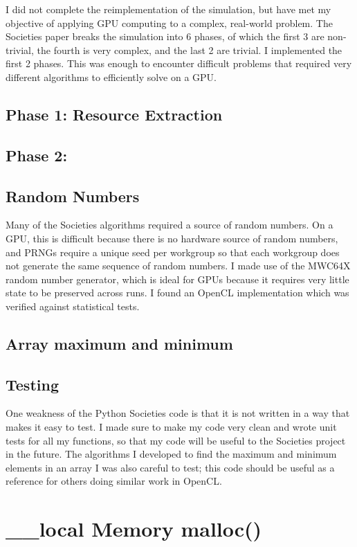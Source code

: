 \documentclass{article}
\begin{document}
I did not complete the reimplementation of the simulation, but have met my objective of applying GPU computing to a complex, real-world problem. The Societies paper\cite{ditta13} breaks the simulation into 6 phases, of which the first 3 are non-trivial, the fourth is very complex, and the last 2 are trivial. I implemented the first 2 phases. This was enough to encounter difficult problems that required very different algorithms to efficiently solve on a GPU.

\subsection{Phase 1: Resource Extraction}

\subsection{Phase 2: }

\subsection{Random Numbers}
Many of the Societies algorithms required a source of random numbers. On a GPU, this is difficult because there is no hardware source of random numbers, and PRNGs require a unique seed per workgroup so that each workgroup does not generate the same sequence of random numbers. I made use of the MWC64X random number generator, which is ideal for GPUs because it requires very little state to be preserved across runs. I found an OpenCL implementation which was verified against statistical tests.\cite{mwc64x}

\subsection{Array maximum and minimum}

\subsection{Testing}
One weakness of the Python Societies code is that it is not written in a way that makes it easy to test. I made sure to make my code very clean  and wrote unit tests for all my functions, so that my code will be useful to the Societies project in the future. The algorithms I developed to find the maximum and minimum elements in an array I was also careful to test; this code should be useful as a reference for others doing similar work in OpenCL.

\section{\_\_local Memory malloc()}



\end{document}
